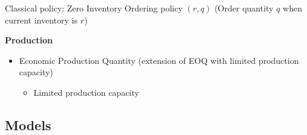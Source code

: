 Classical policy: Zero Inventory Ordering policy $(r,q)$ (Order quantity $q$ when current inventory is $r$)

\medskip

\textbf{Production}

\begin{itemize}
  \item Economic Production Quantity (extension of EOQ with limited production capacity) \cite{Taft1918}
  \begin{itemize}
    \item Limited production capacity
  \end{itemize}
\end{itemize}


\medskip


\medskip


\subsection{Models}
\label{sec:lot-size:single-line:models}




